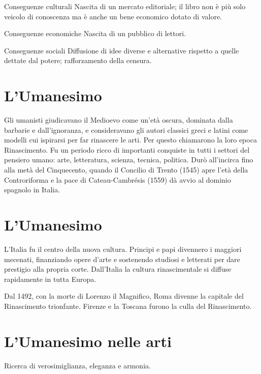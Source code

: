 \documentclass[12pt]{article}
\begin{document}
\begin{defn}{Conseguenze culturali}
Nascita di un mercato editoriale; il libro non è più solo veicolo di conoscenza ma è anche un bene economico dotato di valore.
\end{defn}


\begin{defn}{Conseguenze economiche}
Nascita di un pubblico di lettori.
\end{defn}


\begin{defn}{Conseguenze sociali}
Diffusione di idee diverse e alternative rispetto a quelle dettate dal potere; rafforzamento della censura.
\end{defn}


\section{L'Umanesimo}


Gli umanisti giudicavano il Medioevo come un'età oscura, dominata dalla barbarie e dall'ignoranza, e consideravano gli autori classici greci e latini come modelli cui ispirarsi per far rinascere le arti. Per questo chiamarono la loro epoca Rinascimento. Fu un periodo ricco di importanti conquiste in tutti i settori del pensiero umano: arte, letteratura, scienza, tecnica, politica. Durò all'incirca fino alla metà del Cinquecento, quando il Concilio di Trento (1545) apre l'età della Controriforma e la pace di Cateau-Cambrésis (1559) dà avvio al dominio spagnolo in Italia.


\section{L'Umanesimo}


L'Italia fu il centro della nuova cultura. Principi e papi divennero i maggiori mecenati, finanziando opere d'arte e sostenendo studiosi e letterati per dare prestigio alla propria corte. Dall'Italia la cultura rinascimentale si diffuse rapidamente in tutta Europa.


Dal 1492, con la morte di Lorenzo il Magnifico, Roma divenne la capitale del Rinascimento trionfante. Firenze e la Toscana furono la culla del Rinascimento.


\section{L'Umanesimo nelle arti}


Ricerca di verosimiglianza, eleganza e armonia.
\end{document}
